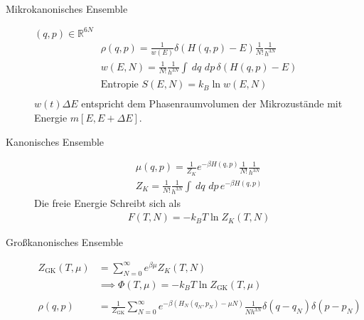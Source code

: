 \documentclass[11pt]{article}
\theoremstyle{plain}
\theoremstyle{mytheoremstyle}
\newcommand{\R}{\mathbb{R}}
\renewcommand{\d}[1]{\,d#1\,}
\begin{document}
\begin{description}
  \item[Mikrokanonisches Ensemble]  $(q, p ) \in \R^{6 N}$
    \begin{align*}
      \rho(q, p) = \frac{1}{w(E)} \delta\left( H(q,p) - E \right)
      \frac{1}{N!} \frac{1}{h^{3N}} \\
      w(E, N) = \frac{1}{N!} \frac{1}{h^{3 N}} \int_{}^{} \d{q}\d{p}
      \delta(H(q,p)-E) \\
      \text{Entropie } S(E, N) = k_B \ln{w(E,N)} \\
    \end{align*}
    $w(t) \Delta E$ entspricht dem Phasenraumvolumen der Mikrozust\"ande mit
    Energie $m[E, E + \Delta E]$.
  \item[Kanonisches Ensemble] 
    \begin{align*}
      \mu (q,p) = \frac{1}{Z_K} e^{-\beta H(q,p)} \frac{1}{N!} \frac{1}{h^{3N}} \\
      Z_K = \frac{1}{N!} \frac{1}{h^{3N}} \int_{}^{} \d{q} \d{p} e^{-\beta H(q,p)}
    \end{align*}
    Die freie Energie Schreibt sich als
    \begin{align*}
      F(T, N) = -k_B T \ln{Z_K(T,N)}
    \end{align*}
  \item[Gro\ss{}kanonisches Ensemble] 
    \begin{align*}
      Z_{\text{GK}} (T, \mu) & = \sum_{N=0}^{\infty} e^{\beta \mu} Z_K (T, N) \\
      & \implies \Phi(T, \mu) = -k_B T \ln{Z_{\text{GK}}(T,\mu)} \\
      \\
      \rho(q,p) & = \frac{1}{Z_{\text{GK}}} \sum_{N=0}^{\infty} e^{-\beta\left( 
      H_N(q_N,p_N) - \mu N\right)} \frac{1}{N h^{3N}} \delta(q-q_N) \delta(p-p_N)
    \end{align*}
\end{description}
\end{document}
